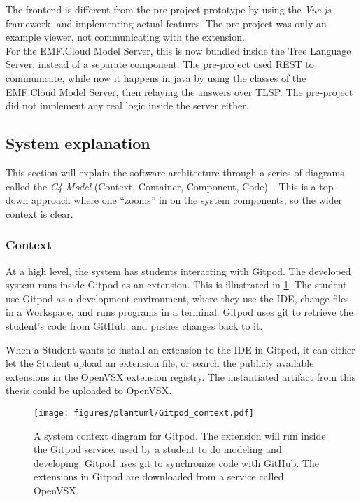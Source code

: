 The frontend is different from the pre-project prototype by using the \textit{Vue.js} framework, and implementing actual features.
The pre-project was only an example viewer, not communicating with the extension.\\

For the EMF.Cloud Model Server, this is now bundled inside the Tree Language Server, instead of a separate component.
The pre-project used \gls{REST} to communicate, while now it happens in java by using the classes of the EMF.Cloud Model Server, then relaying the answers over \acrshort{TLSP}.
The pre-project did not implement any real logic inside the server either.


\subsection{System explanation}
This section will explain the software architecture through a series of diagrams called the \textit{C4 Model} (Context, Container, Component, Code)~\cite{simonbrownC4ModelVisualising}.
This is a top-down approach where one ``zooms'' in on the system components, so the wider context is clear.


\subsubsection{Context}
At a high level, the system has students interacting with \gls{Gitpod}.
The developed system runs inside \gls{Gitpod} as an extension.
This is illustrated in \cref{fig:gitpod-system-context}.
The student use \gls{Gitpod} as a development environment, where they use the \acrshort{IDE}, change files in a Workspace, and runs programs in a terminal.
\Gls{Gitpod} uses \gls{git} to retrieve the student's code from \gls{GitHub}, and pushes changes back to it.

When a Student wants to install an extension to the \acrshort{IDE} in \gls{Gitpod}, it can either let the Student upload an extension file, or search the publicly available extensions in the OpenVSX extension registry.
The instantiated artifact from this thesis could be uploaded to OpenVSX.


\begin{figure}[H]  %
  \centering
  \texttt{[image: figures/plantuml/Gitpod\_context.pdf]}
  \caption[System context diagram for Gitpod]{A system context diagram for Gitpod. The extension will run inside the Gitpod service, used by a student to do modeling and developing. Gitpod uses git to synchronize code with GitHub. The extensions in Gitpod are downloaded from a service called OpenVSX.}\label{fig:gitpod-system-context}
\end{figure}

